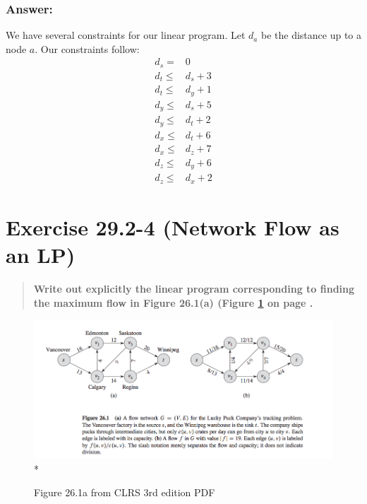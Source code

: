 \documentclass[titlepage]{article}\usepackage[]{graphicx}\usepackage[]{color}
\begin{document}
  \subsubsection{Answer:}
  We have several constraints for our linear program. Let $d_a$ be the
  distance up to a node $a$. Our constraints follow:
  \begin{align*}
    d_s = & 0 \\
    d_t \leq & d_s + 3 \\
    d_t \leq & d_y + 1 \\
    d_y \leq & d_s + 5 \\
    d_y \leq & d_t + 2 \\
    d_x \leq & d_t + 6 \\
    d_x \leq & d_z + 7 \\
    d_z \leq & d_y + 6 \\
    d_z \leq & d_x + 2 
  \end{align*}
\section{Exercise 29.2-4 (Network Flow as an LP)}
  \begin{quote}
    \textbf{Write out explicitly the linear program corresponding to finding
      the maximum flow in Figure 26.1(a) (Figure \ref{fig:26a} on page
      \pageref{fig:26a}.}
  \end{quote}
  \begin{figure}
    \begin{center}
    \includegraphics[scale=0.40]{26.1a.png}\\*
    \end{center}
    \caption{Figure 26.1a from CLRS 3rd edition PDF}
    \label{fig:26a}
  \end{figure}
\end{document}

